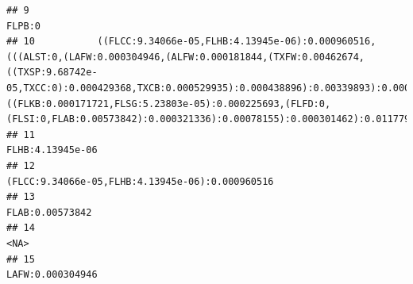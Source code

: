 \documentclass[]{article}
\begin{document}
\begin{verbatim}
## 9                                                                                                                                                                                                                                                                                                                                                                                                             FLPB:0
## 10           ((FLCC:9.34066e-05,FLHB:4.13945e-06):0.000960516,(((ALST:0,(LAFW:0.000304946,(ALFW:0.000181844,(TXFW:0.00462674,((TXSP:9.68742e-05,TXCC:0):0.000429368,TXCB:0.000529935):0.000438896):0.00339893):0.000450879):0.000633288):0.00274534,((FLKB:0.000171721,FLSG:5.23803e-05):0.000225693,(FLFD:0,(FLSI:0,FLAB:0.00573842):0.000321336):0.00078155):0.000301462):0.0117792,FLLG:0.0165186):0.000474876):0
## 11                                                                                                                                                                                                                                                                                                                                                                                                  FLHB:4.13945e-06
## 12                                                                                                                                                                                                                                                                                                                                                                   (FLCC:9.34066e-05,FLHB:4.13945e-06):0.000960516
## 13                                                                                                                                                                                                                                                                                                                                                                                                   FLAB:0.00573842
## 14                                                                                                                                                                                                                                                                                                                                                                                                              <NA>
## 15                                                                                                                                                                                                                                                                                                                                                                                                  LAFW:0.000304946

\end{verbatim}
\end{document}
